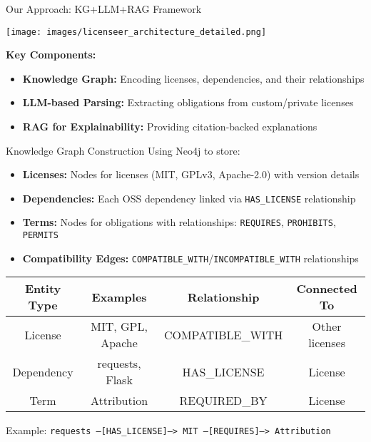 \documentclass{beamer}
\begin{document}
\begin{frame}{Our Approach: KG+LLM+RAG Framework}
\begin{center}
\texttt{[image: images/licenseer\_architecture\_detailed.png]}
\end{center}

\textbf{Key Components:}
\begin{itemize}
\item \textbf{Knowledge Graph:} Encoding licenses, dependencies, and their relationships
\item \textbf{LLM-based Parsing:} Extracting obligations from custom/private licenses
\item \textbf{RAG for Explainability:} Providing citation-backed explanations
\end{itemize}
\end{frame}

\begin{frame}{Knowledge Graph Construction}
Using Neo4j to store:
\begin{itemize}
\item \textbf{Licenses:} Nodes for licenses (MIT, GPLv3, Apache-2.0) with version details
\item \textbf{Dependencies:} Each OSS dependency linked via \texttt{HAS\_LICENSE} relationship
\item \textbf{Terms:} Nodes for obligations with relationships: \texttt{REQUIRES}, \texttt{PROHIBITS}, \texttt{PERMITS}
\item \textbf{Compatibility Edges:} \texttt{COMPATIBLE\_WITH}/\texttt{INCOMPATIBLE\_WITH} relationships
\end{itemize}

\vspace{0.3cm}
\begin{center}
\begin{tabular}{|c|c|c|c|}
\hline
\rowcolor{gray!20}
\textbf{Entity Type} & \textbf{Examples} & \textbf{Relationship} & \textbf{Connected To} \\
\hline
\rowcolor{blue!10}
License & MIT, GPL, Apache & COMPATIBLE\_WITH & Other licenses \\
\hline
\rowcolor{green!10}
Dependency & requests, Flask & HAS\_LICENSE & License \\
\hline
\rowcolor{yellow!10}
Term & Attribution & REQUIRED\_BY & License \\
\hline
\end{tabular}
\end{center}

\vspace{0.2cm}
Example: \texttt{requests --[HAS\_LICENSE]--> MIT --[REQUIRES]--> Attribution}
\end{frame}
\end{document}
